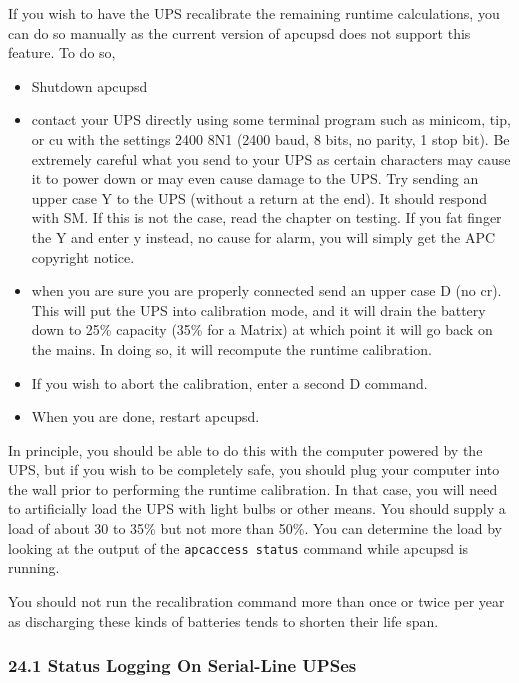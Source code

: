 If you wish to have the UPS recalibrate the remaining runtime calculations,
you can do so manually as the current version of apcupsd does not support this
feature. To do so,  

\begin{itemize}
\item Shutdown apcupsd  
\item contact your UPS directly using some terminal program such as minicom,
tip, or cu with the settings 2400 8N1 (2400 baud, 8 bits, no parity, 1 stop
bit). Be extremely careful what you send to your UPS as certain characters may
cause it to power down or may even cause damage to the UPS. Try sending an
upper case Y to the UPS (without a return at the end). It should respond with
SM. If this is not the case, read the chapter on testing. If you fat finger
the Y and enter y instead, no cause for alarm, you will simply get the APC
copyright notice.  
\item when you are sure you are properly connected send an upper case D (no
cr). This will put the UPS into calibration mode, and it will drain the
battery down to 25\% capacity (35\% for a Matrix) at which point it will go
back on the mains. In doing so, it will recompute the runtime calibration.  
\item If you wish to abort the calibration, enter a second D command.  
\item When you are done, restart apcupsd. 
\end{itemize}

In principle, you should be able to do this with the computer powered by the
UPS, but if you wish to be completely safe, you should plug your computer into
the wall prior to performing the runtime calibration. In that case, you will
need to artificially load the UPS with light bulbs or other means. You should
supply a load of about 30 to 35\% but not more than 50\%. You can determine
the load by looking at the output of the {\tt apcaccess status} command while
apcupsd is running.  

You should not run the recalibration command more than once or twice per year
as discharging these kinds of batteries tends to shorten their life span. 

\label{Status-Logging-On-Serial_002dLine-UPSes}

\subsubsection*{24.1 Status Logging On Serial-Line UPSes}

